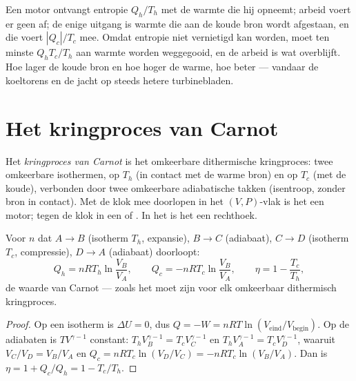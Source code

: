 \begin{remark}\label{rem:b1:heat-engines:why}
Een motor ontvangt entropie $Q_h/T_h$ met de warmte die hij opneemt; arbeid
voert er geen af; de enige uitgang is warmte die aan de koude bron wordt afgestaan,
en die voert $|Q_c|/T_c$ mee. Omdat entropie niet vernietigd kan worden, moet ten minste
$Q_h T_c/T_h$ aan warmte worden weggegooid, en de arbeid is wat overblijft.
Hoe lager de koude bron en hoe hoger de warme, hoe beter --- vandaar
de koeltorens en de jacht op steeds hetere turbinebladen.
\end{remark}

\section{Het kringproces van Carnot}

\begin{definition}\label{def:b1:heat-engines:carnotcycle}
Het \emph{kringproces van Carnot} is het omkeerbare dithermische kringproces: twee omkeerbare
isothermen, op $T_h$ (in contact met de warme bron) en op $T_c$ (met
de koude), verbonden door twee omkeerbare adiabatische takken (isentroop,
zonder bron in contact). Met de klok mee doorlopen in het $(V, P)$-vlak is het een
motor; tegen de klok in een  of . In het
 is het een rechthoek.
\end{definition}

\begin{proposition}\label{prop:b1:heat-engines:carnotgas}
Voor $n$   dat $A \to B$ (isotherm $T_h$,
expansie), $B \to C$ (adiabaat), $C \to D$ (isotherm $T_c$,
compressie), $D \to A$ (adiabaat) doorloopt:
\[
Q_h = nRT_h\ln\frac{V_B}{V_A}, \qquad
Q_c = -nRT_c\ln\frac{V_B}{V_A}, \qquad
\eta = 1 - \frac{T_c}{T_h} ,
\]
de waarde van Carnot --- zoals het moet zijn voor elk omkeerbaar dithermisch kringproces.
\end{proposition}

\begin{proof}
Op een isotherm is $\Delta U = 0$, dus $Q = -W = nRT\ln(V_{\text{eind}}/
V_{\text{begin}})$. Op de adiabaten is $TV^{\gamma-1}$ constant:
$T_hV_B^{\gamma-1} = T_cV_C^{\gamma-1}$ en $T_hV_A^{\gamma-1} =
T_cV_D^{\gamma-1}$, waaruit $V_C/V_D = V_B/V_A$ en $Q_c = nRT_c\ln(V_D/V_C) =
-nRT_c\ln(V_B/V_A)$. Dan is $\eta = 1 + Q_c/Q_h = 1 - T_c/T_h$.
\end{proof}

